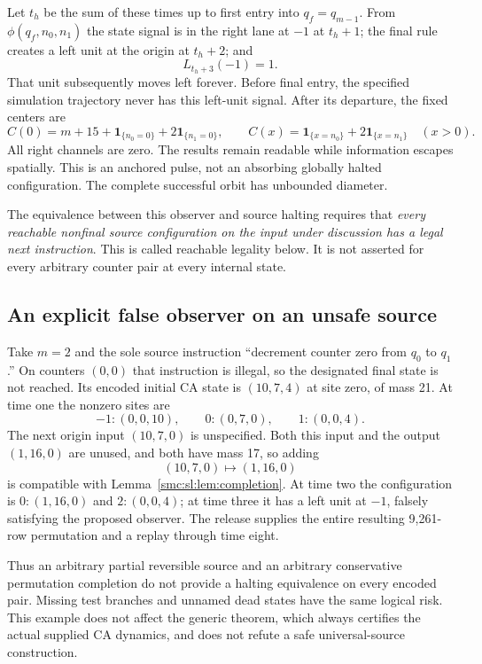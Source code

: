 \documentclass[11pt,letterpaper]{article}
\numberwithin{equation}{section}
\theoremstyle{definition}
\theoremstyle{remark}
\newcommand{\ind}[1]{\mathbf 1_{\{#1\}}}
\begin{document}
Let $t_h$ be the sum of these times up to first entry into $q_f=q_{m-1}$. From $\phi(q_f,n_0,n_1)$ the state signal is in the right lane at $-1$ at $t_h+1$; the final rule creates a left unit at the origin at $t_h+2$; and
\begin{equation}\label{smc:sl:eq:haltpulse}
 L_{t_h+3}(-1)=1.
\end{equation}
That unit subsequently moves left forever. Before final entry, the specified simulation trajectory never has this left-unit signal. After its departure, the fixed centers are
\[
 C(0)=m+15+\ind{n_0=0}+2\ind{n_1=0},
 \qquad C(x)=\ind{x=n_0}+2\ind{x=n_1}\quad(x>0).
\]
All right channels are zero. The results remain readable while information escapes spatially. This is an anchored pulse, not an absorbing globally halted configuration. The complete successful orbit has unbounded diameter.

The equivalence between this observer and source halting requires that \emph{every reachable nonfinal source configuration on the input under discussion has a legal next instruction}. This is called reachable legality below. It is not asserted for every arbitrary counter pair at every internal state.

\subsection{An explicit false observer on an unsafe source}
Take $m=2$ and the sole source instruction ``decrement counter zero from $q_0$ to $q_1$.'' On counters $(0,0)$ that instruction is illegal, so the designated final state is not reached. Its encoded initial CA state is $(10,7,4)$ at site zero, of mass 21. At time one the nonzero sites are
\[
 -1:(0,0,10),\qquad 0:(0,7,0),\qquad 1:(0,0,4).
\]
The next origin input $(10,7,0)$ is unspecified. Both this input and the output $(1,16,0)$ are unused, and both have mass 17, so adding
\[
 (10,7,0)\longmapsto(1,16,0)
\]
is compatible with Lemma~\ref{smc:sl:lem:completion}. At time two the configuration is $0:(1,16,0)$ and $2:(0,0,4)$; at time three it has a left unit at $-1$, falsely satisfying the proposed observer. The release supplies the entire resulting 9,261-row permutation and a replay through time eight.

Thus an arbitrary partial reversible source and an arbitrary conservative permutation completion do not provide a halting equivalence on every encoded pair. Missing test branches and unnamed dead states have the same logical risk. This example does not affect the generic theorem, which always certifies the actual supplied CA dynamics, and does not refute a safe universal-source construction.
\end{document}
